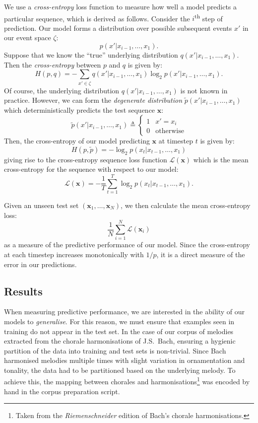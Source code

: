 \documentclass[12pt,a4paper,twoside,openright]{report}
\newcommand{\vect}[1]{\boldsymbol{\mathbf{#1}}}
\begin{document}
We use a \emph{cross-entropy} loss function to measure how well a model predicts
a particular sequence, which is derived as follows.  Consider the
$i$\textsuperscript{th} step of prediction. Our model forms a distribution over
possible subsequent events $x'$ in our event space $\zeta$:
$$ p(x' | x_{i-1}, \ldots, x_1). $$
Suppose that we know the ``true'' underlying distribution $q(x' |
x_{i-1}, \ldots, x_1)$. Then the \emph{cross-entropy} between $p$ and
$q$ is given by:
$$ H(p,q) = - \sum_{x' \in \zeta} q(x' | x_{i-1}, \ldots, x_1) \log_2{ p(x' |
x_{i-1}, \ldots, x_1)}. $$
Of course, the underlying distribution $q(x' | x_{i-1}, \ldots, x_1)$ is not
known in practice. However, we can form the \emph{degenerate distribution}
$\widetilde{p}(x' | x_{i-1}, \ldots, x_1)$ which deterministically predicts the
test sequence $\vect{x}$:
$$ \widetilde{p}(x' | x_{i-1}, \ldots, x_1) \triangleq \begin{cases}
  1 & x' = x_i \\
  0 & \text{otherwise}
\end{cases} $$
Then, the cross-entropy of our model predicting $\vect{x}$ at timestep $t$ is
given by: 
$$ H(p,\widetilde{p}) = - \log_2{ p(x_t | x_{t-1}, \ldots, x_1) } $$
giving rise to the cross-entropy sequence loss function
$\mathcal{L}(\vect{x})$
which is the mean cross-entropy for the sequence with respect to our model:
$$ \mathcal{L}(\vect{x}) = - \frac{1}{T} \sum_{t = 1}^T \log_2{ p(x_t | x_{t-1},
\ldots, x_1) }. $$

Given an unseen test set $(\vect{x}_1,\ldots,\vect{x}_N)$, we then calculate the
mean cross-entropy loss:
$$ \frac{1}{N}\sum_{i = 1}^N \mathcal{L}(\vect{x}_i) $$
as a measure of the predictive performance of our model. Since the cross-entropy
at each timestep increases monotonically with $1/p$, it is a direct measure of
the error in our predictions. 

\subsection{Results}

When measuring predictive performance, we are interested in the ability of our
models to \emph{generalise}. For this reason, we must ensure that examples seen
in training do not appear in the test set. In the case of our corpus of melodies
extracted from the chorale harmonisations of J.S.\ Bach, ensuring a hygienic
partition of the data into training and test sets is non-trivial. Since Bach
harmonised melodies multiple times with slight variation in ornamentation and
tonality, the data had to be partitioned based on the underlying melody. To
achieve this, the mapping between chorales and harmonisations\footnote{Taken
from the \emph{Riemenschneider} edition of Bach's chorale harmonisations.} was
encoded by hand in the corpus preparation script.
\end{document}
